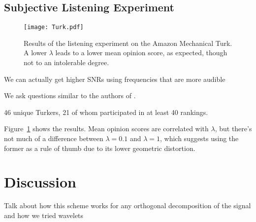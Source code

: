 \documentclass[runningheads]{llncs}
\begin{document}
\subsection{Subjective Listening Experiment}

\begin{figure}
  \centering
  \texttt{[image: Turk.pdf]}
  \caption{Results of the listening experiment on the Amazon Mechanical Turk.  A lower $\lambda$ leads to a lower mean opinion score, as expected, though not to an intolerable degree.}
  \label{fig:TurkResults}
\end{figure}


We can actually get higher SNRs using frequencies that are more audible

We ask questions similar to the authors of \cite{bassia2001robust}.

46 unique Turkers, 21 of whom participated in at least 40 rankings.

Figure~\ref{fig:TurkResults} shows the results.  Mean opinion scores are correlated with $\lambda$, but there's not much of a difference between $\lambda=0.1$ and $\lambda=1$, which suggests using the former as a rule of thumb due to its lower geometric distortion.

\section{Discussion}


Talk about how this scheme works for any orthogonal decomposition of the signal and how we tried wavelets

%
%
%


%
\end{document}
